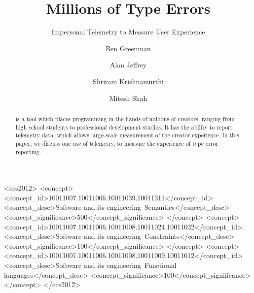 \documentclass[
  acmsmall,
  review,
]{acmart}
\begin{document}
\title{Millions of Type Errors}
\subtitle{Impersonal Telemetry to Measure User Experience}


\author{Ben Greenman}

\author{Alan Jeffrey}
\email{}

\author{Shriram Krishnamurthi}

\author{Mitesh Shah}
\email{}


\begin{abstract}
   is a tool which places programming in the hands of
  millions of creators, ranging from high school students to professional
  development studios. It has the ability to report telemetry data,
  which allows large-scale measurement of the creator experience. In
  this paper, we discuss one use of telemetry, to measure the experience
  of type error reporting.
\end{abstract}

\newcommand{\code}[1]{\texttt{#1}}
\newcommand{\FILL}{\textbf{FILL}}
\newcommand{\dotscale}[1]{\scalebox{0.72}{#1}}
\newcommand{\wideas}[2]{\makebox[\widthof{#2}][l]{#1}}
\newcommand{\twoline}[2]{\parbox[s]{1.4cm}{\flushleft#1\newline#2}}
\newcommand{\chkYes}{\dotscale{\CIRCLE}}
\newcommand{\chkMaybe}{\wideas{\dotscale{\Circle}}{\chkYes}}
\newcommand{\chkNo}{\wideas{}{\chkYes}}


\begin{CCSXML}
<ccs2012>
<concept>
<concept_id>10011007.10011006.10011039.10011311</concept_id>
<concept_desc>Software and its engineering~Semantics</concept_desc>
<concept_significance>500</concept_significance>
</concept>
<concept>
<concept_id>10011007.10011006.10011008.10011024.10011032</concept_id>
<concept_desc>Software and its engineering~Constraints</concept_desc>
<concept_significance>100</concept_significance>
</concept>
<concept>
<concept_id>10011007.10011006.10011008.10011009.10011012</concept_id>
<concept_desc>Software and its engineering~Functional languages</concept_desc>
<concept_significance>100</concept_significance>
</concept>
</ccs2012>
\end{CCSXML}
\end{document}

